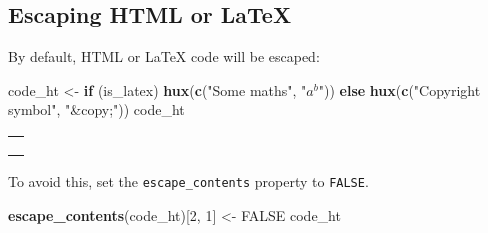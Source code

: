\documentclass[]{article}
\newenvironment{Shaded}{\begin{snugshade}}{\end{snugshade}}
\newcommand{\KeywordTok}[1]{\textcolor[rgb]{0.13,0.29,0.53}{\textbf{#1}}}
\newcommand{\DecValTok}[1]{\textcolor[rgb]{0.00,0.00,0.81}{#1}}
\newcommand{\StringTok}[1]{\textcolor[rgb]{0.31,0.60,0.02}{#1}}
\newcommand{\OtherTok}[1]{\textcolor[rgb]{0.56,0.35,0.01}{#1}}
\newcommand{\ControlFlowTok}[1]{\textcolor[rgb]{0.13,0.29,0.53}{\textbf{#1}}}
\newcommand{\NormalTok}[1]{#1}
\begin{document}
\FloatBarrier

\subsection{Escaping HTML or LaTeX}\label{escaping-html-or-latex}

By default, HTML or LaTeX code will be escaped:

\begin{Shaded}
\begin{Highlighting}[]
\NormalTok{code_ht <-}\StringTok{ }\ControlFlowTok{if}\NormalTok{ (is_latex) }\KeywordTok{hux}\NormalTok{(}\KeywordTok{c}\NormalTok{(}\StringTok{"Some maths"}\NormalTok{, }\StringTok{"$a^b$"}\NormalTok{)) }\ControlFlowTok{else} 
      \KeywordTok{hux}\NormalTok{(}\KeywordTok{c}\NormalTok{(}\StringTok{"Copyright symbol"}\NormalTok{, }\StringTok{"&copy;"}\NormalTok{))}
\NormalTok{code_ht}
\end{Highlighting}
\end{Shaded}

\begin{table}[h]
\centering\begin{tabularx}{0.5\textwidth}{p{}}


\hhline{}
\arrayrulecolor{black}

\multicolumn{1}{!{\vrule width 0pt}l!{\vrule width 0pt}}{\cellcolor[RGB]{255, 255, 255}\rule{0pt}{\baselineskip+4pt}\raggedright Some maths\rule[-4pt]{0pt}{4pt}} \tabularnewline[-0.5pt]


\hhline{}
\arrayrulecolor{black}

\multicolumn{1}{!{\vrule width 0pt}l!{\vrule width 0pt}}{\cellcolor[RGB]{255, 255, 255}\rule{0pt}{\baselineskip+4pt}\raggedright \$a\verb|^|b\$\rule[-4pt]{0pt}{4pt}} \tabularnewline[-0.5pt]


\hhline{}
\arrayrulecolor{black}
\end{tabularx}
\end{table}

\FloatBarrier

To avoid this, set the \texttt{escape\_contents} property to
\texttt{FALSE}.

\begin{Shaded}
\begin{Highlighting}[]
\KeywordTok{escape_contents}\NormalTok{(code_ht)[}\DecValTok{2}\NormalTok{, }\DecValTok{1}\NormalTok{] <-}\StringTok{ }\OtherTok{FALSE}
\NormalTok{code_ht}
\end{Highlighting}
\end{Shaded}
\end{document}
